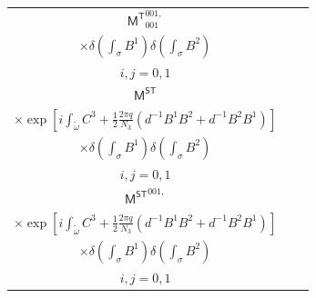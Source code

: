 \documentclass[11pt,nofootinbib,preprint]{revtex4-1}
\begin{document}
\begin{table}
\begin{tabular*}{\textwidth}{ccc}
		\midrule
		$\mathsf{M^T}_{001}^{001,}$ & \thead{$4\exp \left[ i\int_{\gamma}{A^3}+i\int_{\tilde{\omega}}{C^3+\frac{1}{2}\frac{2\pi q}{N_3}\left( d^{-1}B^1B^2+d^{-1}B^2B^1 \right)} \right]$ \\ $\times\delta \left( \int_{\sigma}{B^1} \right) \delta \left( \int_{\sigma}{B^2} \right)$} & \thead{$\mathsf{M^T}_{001}^{001,}=\mathsf{M^T}_{001}^{001,ij0}$ \\ $i,j=0,1$} \\
		\midrule
		$\mathsf{M^{ST}}$ & \thead{$8\exp \left[ i\int_{\omega}{C^3+\frac{1}{2}\frac{2\pi q}{N_3}\left( d^{-1}B^1B^2+d^{-1}B^2B^1 \right)} \right]$ \\$\times\exp \left[ i\int_{\tilde{\omega}}{C^3+\frac{1}{2}\frac{2\pi q}{N_3}\left( d^{-1}B^1B^2+d^{-1}B^2B^1 \right)} \right]$\\ $\times\delta \left( \int_{\sigma}{B^1} \right) \delta \left( \int_{\sigma}{B^2} \right)$} & \thead{$\mathsf{M^{ST}}=\mathsf{M^{ST}}^{,ij0}$ \\ $i,j=0,1$} \\
		\midrule
		$\mathsf{M^{ST}}^{001,}$ & \thead{$8\exp \left[ i\int_{\gamma}{A^3}+i\int_{\omega}{C^3+\frac{1}{2}\frac{2\pi q}{N_3}\left( d^{-1}B^1B^2+d^{-1}B^2B^1 \right)} \right]$ \\$\times\exp \left[ i\int_{\tilde{\omega}}{C^3+\frac{1}{2}\frac{2\pi q}{N_3}\left( d^{-1}B^1B^2+d^{-1}B^2B^1 \right)} \right]$\\ $\times\delta \left( \int_{\sigma}{B^1} \right) \delta \left( \int_{\sigma}{B^2} \right)$} & \thead{$\mathsf{M^{ST}}^{001,}=\mathsf{M^{ST}}^{001,ij0}$ \\ $i,j=0,1$} \\
		\bottomrule
	\end{tabular*}
\end{table}
\end{document}
